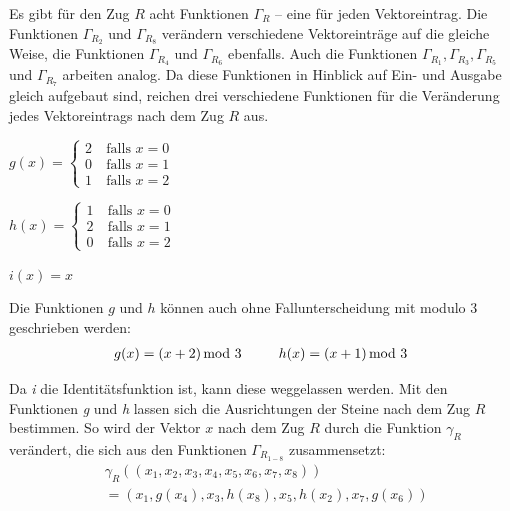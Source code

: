 \documentclass[12pt,a4paper, usenames, dvipsnames]{article}
\theoremstyle{mystyle}
\theoremstyle{definition}
\begin{document}
Es gibt für den Zug $R$ acht Funktionen $\Gamma_R$ -- eine für jeden Vektoreintrag. Die Funktionen $\Gamma_{R_2}$ und $\Gamma_{R_8}$ verändern verschiedene Vektoreinträge auf die gleiche Weise, die Funktionen $\Gamma_{R_4}$ und $\Gamma_{R_6}$ ebenfalls. Auch die Funktionen $\Gamma_{R_1}, \Gamma_{R_3}, \Gamma_{R_5}$ und $\Gamma_{R_7}$ arbeiten analog. Da diese Funktionen in Hinblick auf Ein- und Ausgabe gleich aufgebaut sind, reichen drei verschiedene Funktionen für die Veränderung jedes Vektoreintrags nach dem Zug $R$ aus.
\\

\begin{minipage}{0.35\textwidth}
\centering
$g(x)= \begin{cases}
2 & \ \text{falls } x = 0 \\ 
0 & \ \text{falls } x = 1 \\
1 & \ \text{falls } x = 2 
\end{cases}$
\end{minipage}
\begin{minipage}{0.35\textwidth}
\centering
$h(x)= \begin{cases}
1 & \ \text{falls } x = 0 \\ 
2 & \ \text{falls } x = 1 \\
0 & \ \text{falls } x = 2 
\end{cases}$
\end{minipage}
\begin{minipage}{0.3\textwidth}
\centering
$i(x) = x$
\end{minipage}
\vspace*{1em}

Die Funktionen $g$ und $h$ können auch ohne Fallunterscheidung mit modulo 3 geschrieben werden:
\begin{align*}
g(x)=(x+2) \hspace*{-0.5em} \mod 3 \ \ \ \ \ \ \ \ h(x) = (x+1) \hspace*{-0.5em} \mod 3
\end{align*}

Da \textit{i} die Identitätsfunktion ist, kann diese weggelassen werden.
Mit den Funktionen \textit{g} und \textit{h} lassen sich die Ausrichtungen der Steine nach dem Zug $R$ bestimmen. So wird der Vektor $x$ nach dem Zug $R$ durch die Funktion $\gamma_R$ verändert, die sich aus den Funktionen $\Gamma_{R_{1-8}}$ zusammensetzt:
\begin{align*}
& \gamma_R \left( (x_1, x_2, x_3, x_4, x_5, x_6, x_7, x_8  ) \right) \\ 
& =  \left( x_1, g(x_4), x_3, h(x_8), x_5, h(x_2), x_7, g(x_6) \right)
\end{align*}
\end{document}
